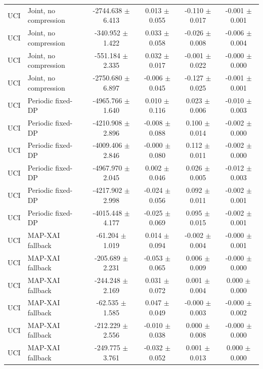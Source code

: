 \begin{table}[t]
\begin{tabular}{llcccc}
UCI & Joint, no compression & -2744.638 $\pm$ 6.413 & 0.013 $\pm$ 0.055 & -0.110 $\pm$ 0.017 & -0.001 $\pm$ 0.001 \\
UCI & Joint, no compression & -340.952 $\pm$ 1.422 & 0.033 $\pm$ 0.058 & -0.026 $\pm$ 0.008 & -0.006 $\pm$ 0.004 \\
UCI & Joint, no compression & -551.184 $\pm$ 2.335 & 0.032 $\pm$ 0.017 & -0.001 $\pm$ 0.022 & -0.000 $\pm$ 0.000 \\
UCI & Joint, no compression & -2750.680 $\pm$ 6.897 & -0.006 $\pm$ 0.045 & -0.127 $\pm$ 0.025 & -0.001 $\pm$ 0.001 \\
UCI & Periodic fixed-DP & -4965.766 $\pm$ 1.640 & 0.010 $\pm$ 0.116 & 0.023 $\pm$ 0.006 & -0.010 $\pm$ 0.003 \\
UCI & Periodic fixed-DP & -4210.908 $\pm$ 2.896 & -0.008 $\pm$ 0.088 & 0.100 $\pm$ 0.014 & -0.002 $\pm$ 0.000 \\
UCI & Periodic fixed-DP & -4009.406 $\pm$ 2.846 & -0.000 $\pm$ 0.080 & 0.112 $\pm$ 0.011 & -0.002 $\pm$ 0.000 \\
UCI & Periodic fixed-DP & -4967.970 $\pm$ 2.045 & 0.002 $\pm$ 0.046 & 0.026 $\pm$ 0.005 & -0.012 $\pm$ 0.003 \\
UCI & Periodic fixed-DP & -4217.902 $\pm$ 2.998 & -0.024 $\pm$ 0.056 & 0.092 $\pm$ 0.011 & -0.002 $\pm$ 0.001 \\
UCI & Periodic fixed-DP & -4015.448 $\pm$ 4.177 & -0.025 $\pm$ 0.069 & 0.095 $\pm$ 0.015 & -0.002 $\pm$ 0.001 \\
UCI & MAP-XAI fallback & -61.204 $\pm$ 1.019 & 0.014 $\pm$ 0.094 & -0.002 $\pm$ 0.004 & -0.000 $\pm$ 0.001 \\
UCI & MAP-XAI fallback & -205.689 $\pm$ 2.231 & -0.053 $\pm$ 0.065 & 0.006 $\pm$ 0.009 & -0.000 $\pm$ 0.000 \\
UCI & MAP-XAI fallback & -244.248 $\pm$ 2.169 & 0.031 $\pm$ 0.072 & 0.001 $\pm$ 0.004 & 0.000 $\pm$ 0.000 \\
UCI & MAP-XAI fallback & -62.535 $\pm$ 1.585 & 0.047 $\pm$ 0.049 & -0.000 $\pm$ 0.003 & -0.000 $\pm$ 0.002 \\
UCI & MAP-XAI fallback & -212.229 $\pm$ 2.556 & -0.010 $\pm$ 0.038 & 0.000 $\pm$ 0.008 & -0.000 $\pm$ 0.000 \\
UCI & MAP-XAI fallback & -249.775 $\pm$ 3.761 & -0.032 $\pm$ 0.052 & 0.001 $\pm$ 0.013 & 0.000 $\pm$ 0.000 \\
\bottomrule
\end{tabular}
\end{table}
